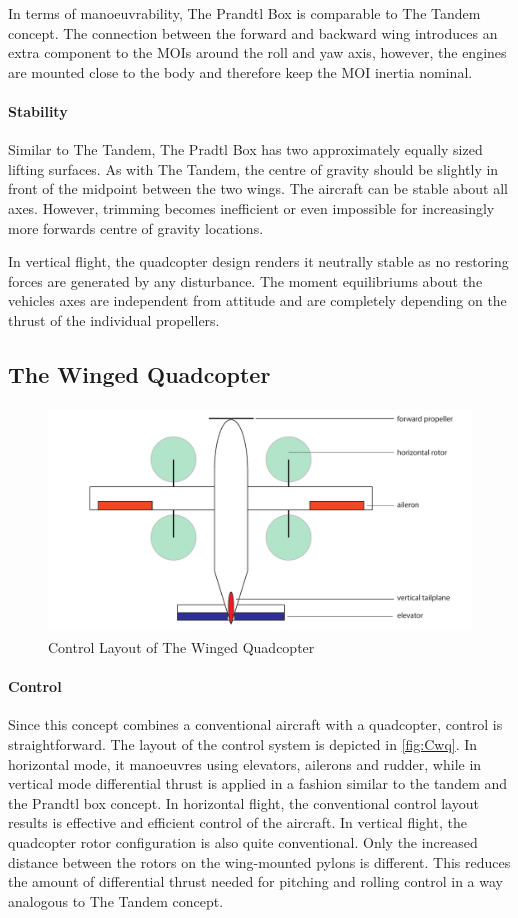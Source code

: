 In terms of manoeuvrability, The Prandtl Box is comparable to The Tandem concept. The connection between the forward and backward wing introduces an extra component to the MOIs around the roll and yaw axis, however, the engines are mounted close to the body and therefore keep the MOI inertia nominal.

\paragraph{Stability}

Similar to The Tandem, The Pradtl Box has two approximately equally sized lifting surfaces. As with The Tandem, the centre of gravity should be slightly in front of the midpoint between the two wings. The aircraft can be stable about all axes. However, trimming becomes inefficient or even impossible for increasingly more forwards centre of gravity locations. 

In vertical flight, the quadcopter design renders it neutrally stable as no restoring forces are generated by any disturbance. The moment equilibriums about the vehicles axes are independent from attitude and are completely depending on the thrust of the individual propellers.

\subsection{The Winged Quadcopter}
\begin{figure}[htb]
    \centering
    \includegraphics[height=6cm]{Stability/Figures/concept_5.pdf}
    \caption{Control Layout of The Winged Quadcopter}
    \label{fig:Cwq}
\end{figure}
\paragraph{Control}

Since this concept combines a conventional aircraft with a quadcopter, control is straightforward. The layout of the control system is depicted in \autoref{fig:Cwq}. In horizontal mode, it manoeuvres using elevators, ailerons and rudder, while in vertical mode differential thrust is applied in a fashion similar to the tandem and the Prandtl box concept. In horizontal flight, the conventional control layout results is effective and efficient control of the aircraft. In vertical flight, the quadcopter rotor configuration is also quite conventional. Only the increased distance between the rotors on the wing-mounted pylons is different. This reduces the amount of differential thrust needed for pitching and rolling control in a way analogous to The Tandem concept.

